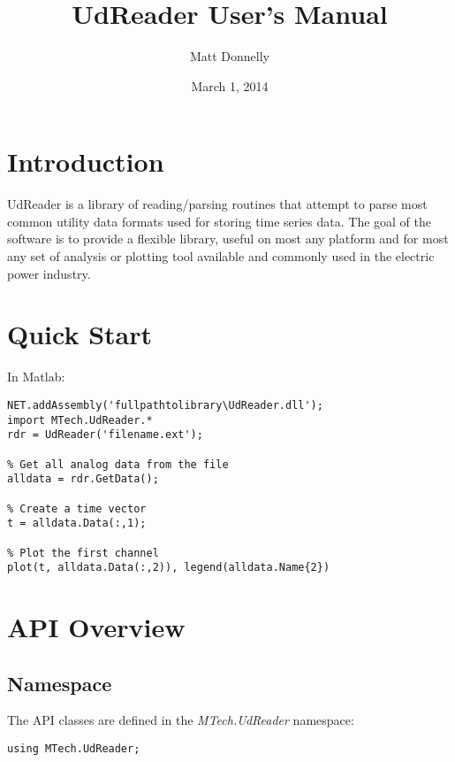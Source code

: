 \documentclass[11pt,letterpaper,article]{memoir} %
\title{UdReader User's Manual}
\author{Matt Donnelly}
\date{March 1, 2014} %
\begin{document}
\maketitle
\tableofcontents* %



\chapter{Introduction}
UdReader is a library of reading/parsing routines that attempt to parse most common utility data formats used for storing time series data. The goal of the software is to provide a flexible library, useful on most any platform and for most any set of analysis or plotting tool available and commonly used in the electric power industry. 



\chapter{Quick Start}

In Matlab:

\lstset{language=Matlab}
\begin{lstlisting}
NET.addAssembly('fullpathtolibrary\UdReader.dll');
import MTech.UdReader.*
rdr = UdReader('filename.ext');

% Get all analog data from the file
alldata = rdr.GetData(); 

% Create a time vector
t = alldata.Data(:,1);  

% Plot the first channel
plot(t, alldata.Data(:,2)), legend(alldata.Name{2})
\end{lstlisting}


\chapter{API Overview}
\section{Namespace}
The API classes are defined in the {\em MTech.UdReader} namespace:

\lstset{language=C}
\begin{lstlisting}
using MTech.UdReader;
\end{lstlisting}
\end{document}
